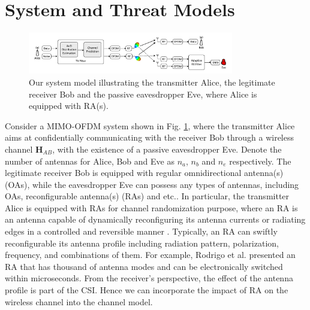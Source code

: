 \section{System and Threat Models}
\begin{figure}[!t]
    \vspace{-15pt}
    \centerline{
    \includegraphics[width=0.8\textwidth]{figs/system.pdf}}
    \caption{Our system model illustrating the transmitter Alice, the legitimate receiver Bob and the passive eavesdropper Eve, where Alice is equipped with RA(s).}
    \label{fig:system}
    \vspace{-15pt}
\end{figure}

Consider a MIMO-OFDM system shown in Fig. \ref{fig:system}, where the transmitter Alice aims at confidentially communicating with the receiver Bob through a wireless channel $\mathbf{H}_{AB}$, with the existence of a passive eavesdropper Eve. Denote the number of antennas for Alice, Bob and Eve as $n_{a}$, $n_{b}$ and $n_{e}$ respectively. 
The legitimate receiver Bob is equipped with regular omnidirectional antenna(s) (OAs), while the eavesdropper Eve can possess any types of antennas, including OAs, reconfigurable antenna(s) (RAs) and etc.. In particular, the transmitter Alice is equipped with RAs for channel randomization purpose, where an RA is an antenna capable of dynamically reconfiguring its antenna currents or radiating edges in a controlled and reversible manner \cite{bernhard2007reconfigurable}. Typically, an RA can swiftly reconfigurable its antenna profile including radiation pattern, polarization, frequency, and combinations of them. For example, Rodrigo et al. \cite{rodrigo2014frequency} presented an RA that has thousand of antenna modes and can be electronically switched within microseconds. From the receiver's perspective, the effect of the antenna profile is part of the CSI. Hence we can incorporate the impact of RA on the wireless channel into the channel model.

